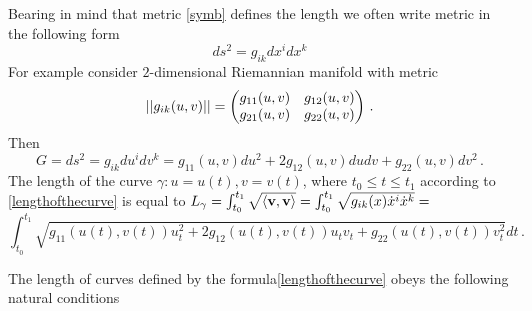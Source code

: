 \documentclass[12pt]{article}
\theoremstyle{theorem}
\numberwithin{equation}{section}
\begin{document}
Bearing in mind that metric \eqref{symb} defines the length
we often write metric in the following form
\begin{equation*}\label{metric}
  ds^2=g_{ik}dx^idx^k
\end{equation*}
For example consider $2$-dimensional Riemannian manifold with metric
                    $$
                 ||g_{ik}(u,v)||=
                     \begin{pmatrix}
                     g_{11}(u,v) &g_{12}(u,v)\cr
                     g_{21}(u,v) &g_{22}(u,v)\cr
                    \end{pmatrix}\,.
                    $$
        Then
                           $$
 G=ds^2=g_{ik}du^idv^k=g_{11}(u,v)du^2+2g_{12}(u,v)dudv+g_{22}(u,v)dv^2\,.
                         $$
     The length of the curve
$\gamma\colon u=u(t),v=v(t)$, where $t_0\leq t\leq t_1$
                according to \eqref{lengthofthecurve} is equal to
$L_\gamma=\int_{t_0}^{t_1} \sqrt {\langle{\bf v},{\bf v}\rangle}=
  \int_{t_0}^{t_1} \sqrt {g_{ik}(x)\dot x^i \dot x^k}=$
  \begin{equation}
\int_{t_0}^{t_1}
\sqrt {{g_{11}}\left(u\left(t\right),v\left(t\right)\right)u_t^2
+2{g_{12}}\left(u\left(t\right),v\left(t\right)\right)u_tv_t+
{g_{22}}\left(u\left(t\right),v\left(t\right)\right)v_t^2}dt\,.
\end{equation}

The length of  curves defined by the
formula\eqref{lengthofthecurve} obeys the following natural conditions
\end{document}
